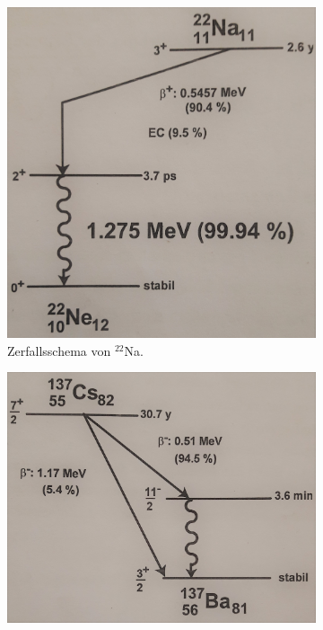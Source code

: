 \begin{figure}[H]
	\centering
	\begin{subfigure}[t]{0.5\textwidth}
		\centering
		\includegraphics[width=\textwidth]{img/ZerfallsschemaVonNa22}
		\caption{Zerfallsschema von $^{22}$Na.}
	\end{subfigure}
	\begin{subfigure}[t]{0.5\textwidth}
		\centering
		\includegraphics[width=\textwidth]{img/ZerfallsschemaVonCs137}

\end{subfigure}
\end{figure}
